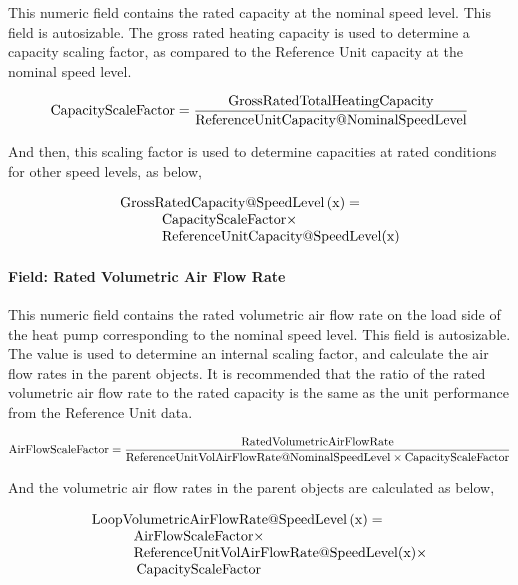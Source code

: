 This numeric field contains the rated capacity at the nominal speed level. This field is autosizable. The gross rated heating capacity is used to determine a capacity scaling factor, as compared to the Reference Unit capacity at the nominal speed level.

\begin{equation}
\rm{CapacityScaleFactor} = \frac{{{\rm{Gross RatedTotalHeatingCapacity}}}}{{{\rm{ReferenceUnitCapacity}}@{\rm{NominalSpeedLevel}}}}
\end{equation}

And then, this scaling factor is used to determine capacities at rated conditions for other speed levels, as below,

\begin{equation}
  \begin{array}{l}
    \rm{Gross RatedCapacity} @ \rm{SpeedLevel} \left( \rm{x} \right) = \\
    \quad \quad \quad \rm{CapacityScaleFactor} \times \\
    \quad \quad \quad \rm{ReferenceUnitCapacity} @ \rm{SpeedLevel}(\rm{x})
  \end{array}
\end{equation}

\paragraph{Field: Rated Volumetric Air Flow Rate}\label{field-rated-volumetric-air-flow-rate}

This numeric field contains the rated volumetric air flow rate on the load side of the heat pump corresponding to the nominal speed level. This field is autosizable. The value is used to determine an internal scaling factor, and calculate the air flow rates in the parent objects. It is recommended that the ratio of the rated volumetric air flow rate to the rated capacity is the same as the unit performance from the Reference Unit data.

\begin{equation}
{\rm{AirFlowScaleFactor}} = \frac{{{\rm{RatedVolumetricAirFlowRate}}}}{{{\rm{ReferenceUnitVolAirFlowRate}}@{\rm{NominalSpeedLevel}} \times {\rm{CapacityScaleFactor}}}}
\end{equation}

And the volumetric air flow rates in the parent objects are calculated as below,

\begin{equation}
  \begin{array}{l}
    {\rm{LoopVolumetricAirFlowRate}}@{\rm{SpeedLevel}}\left( {\rm{x}} \right) = \\
    \quad \quad \quad {\rm{AirFlowScaleFactor}} \times \\
    \quad \quad \quad {\rm{ReferenceUnitVolAirFlowRate}}@{\rm{SpeedLevel}}({\rm{x}}) \times \\
    \quad {\kern 1pt} {\kern 1pt} \quad \quad {\rm{CapacityScaleFactor}}
  \end{array}
\end{equation}

